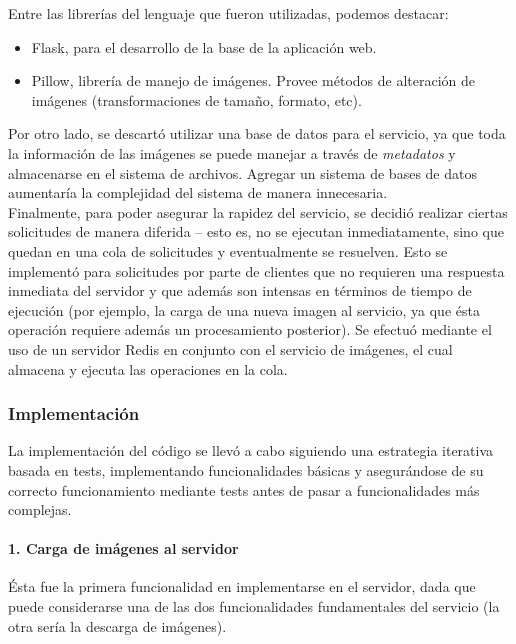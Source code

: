 \documentclass[11pt,letterpaper]{article}
\begin{document}
Entre las librerías del lenguaje que fueron utilizadas, podemos destacar:
\begin{itemize}
    \item Flask\cite{flask}, para el desarrollo de la base de la aplicación web.
    \item Pillow\cite{pillow}, librería de manejo de imágenes. Provee métodos de alteración de imágenes (transformaciones de tamaño, formato, etc).
\end{itemize}

Por otro lado, se descartó utilizar una base de datos para el servicio, ya que toda la información de las imágenes se puede manejar a través de \emph{metadatos} y almacenarse en el sistema de archivos. Agregar un sistema de bases de datos aumentaría la complejidad del sistema de manera innecesaria.\\

Finalmente, para poder asegurar la rapidez del servicio, se decidió realizar ciertas solicitudes de manera diferida -- esto es, no se ejecutan inmediatamente, sino que quedan en una cola de solicitudes y eventualmente se resuelven. Esto se implementó para solicitudes por parte de clientes que no requieren una respuesta inmediata del servidor y que además son intensas en términos de tiempo de ejecución (por ejemplo, la carga de una nueva imagen al servicio, ya que ésta operación requiere además un procesamiento posterior). Se efectuó mediante el uso de un servidor Redis en conjunto con el servicio de imágenes, el cual almacena y ejecuta las operaciones en la cola.
\newpage
\subsubsection{Implementación}

La implementación del código se llevó a cabo siguiendo una estrategia iterativa basada en tests, implementando funcionalidades básicas y asegurándose de su correcto funcionamiento mediante tests antes de pasar a funcionalidades más complejas.

\paragraph{1. Carga de imágenes al servidor}

Ésta fue la primera funcionalidad en implementarse en el servidor, dada que puede considerarse una de las dos funcionalidades fundamentales del servicio (la otra sería la descarga de imágenes).\\
\end{document}
